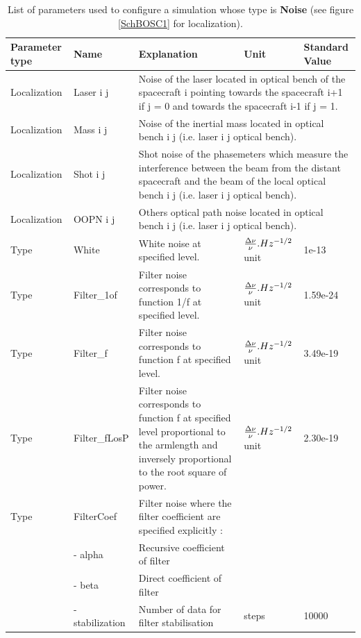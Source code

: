 \documentclass[a4paper,english,12pt]{article}
\begin{document}
\begin{table}[p]
\caption{List of parameters used to configure a simulation whose type is  \textbf{Noise} (see figure \ref{SchBOSC1} for localization). }
\begin{center} 
\begin{tabular}{|p{}|p{}|p{65mm}|p{}|p{}|} 
\hline 
\textbf{Parameter type} & \textbf{Name} & \textbf{Explanation} & \textbf{Unit} & \textbf{Standard Value}  \\ 
\hline
Localization & Laser i j & \multicolumn{3}{|p{110.mm}|}{ Noise of the laser located in optical bench of the spacecraft i pointing towards the spacecraft i+1 if j = 0 and towards the spacecraft i-1 if j = 1. } \\
\hline
Localization & Mass i j & \multicolumn{3}{|p{110.mm}|}{ Noise of the inertial mass located in optical bench i j (i.e. laser i j optical bench). } \\
\hline
Localization & Shot i j & \multicolumn{3}{|p{110.mm}|}{ Shot noise of the phasemeters  which measure the interference between the beam from the distant spacecraft and the beam of  the local optical bench i j (i.e. laser i j optical bench). } \\
\hline
Localization & OOPN i j & \multicolumn{3}{|p{110.mm}|}{ Others optical path noise located in optical bench i j (i.e. laser i j optical bench). } \\
\hline
Type & White  & White noise at specified level. & ${\Delta \nu \over \nu} . Hz^{-1/2} $ unit & 1e-13 \\
\hline
Type & Filter\_1of  & Filter noise corresponds to function 1/f at specified level. & ${\Delta \nu \over \nu} . Hz^{-1/2} $ unit & 1.59e-24 \\
\hline
Type & Filter\_f  & Filter noise corresponds to function f at specified level. & ${\Delta \nu \over \nu} . Hz^{-1/2} $ unit & 3.49e-19 \\
\hline
Type & Filter\_fLosP  & Filter noise corresponds to function f at specified level proportional to the armlength and inversely proportional to the root square of power. & ${\Delta \nu \over \nu} . Hz^{-1/2} $ unit & 2.30e-19 \\
\hline
Type & FilterCoef  & Filter noise where the filter coefficient are specified explicitly : & &  \\
 & - alpha & Recursive coefficient of filter & &  \\
 & - beta & Direct coefficient of filter & &  \\
 & - stabilization & Number of data for filter stabilisation & steps &  10000 \\ 
\hline
\end{tabular} 
\end{center} 
\label{table_paramNoise} 
\end{table}
\end{document}
